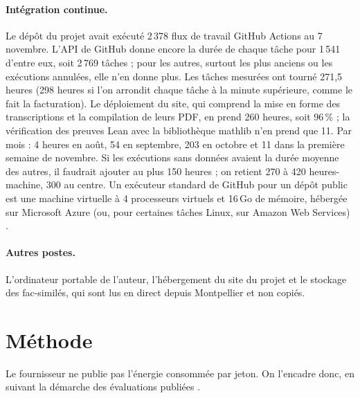 \documentclass[11pt,a4paper]{article}
\begin{document}
\paragraph{Intégration continue.} Le dépôt du projet avait exécuté 2\,378 flux de travail GitHub Actions au 7 novembre. L'API de GitHub donne encore la durée de chaque tâche pour 1\,541 d'entre eux, soit 2\,769 tâches ; pour les autres, surtout les plus anciens ou les exécutions annulées, elle n'en donne plus. Les tâches mesurées ont tourné 271,5 heures (298 heures si l'on arrondit chaque tâche à la minute supérieure, comme le fait la facturation). Le déploiement du site, qui comprend la mise en forme des transcriptions et la compilation de leurs PDF, en prend 260 heures, soit 96\,\% ; la vérification des preuves Lean avec la bibliothèque mathlib n'en prend que 11. Par mois : 4 heures en août, 54 en septembre, 203 en octobre et 11 dans la première semaine de novembre. Si les exécutions sans données avaient la durée moyenne des autres, il faudrait ajouter au plus 150 heures ; on retient 270 à 420 heures-machine, 300 au centre. Un exécuteur standard de GitHub pour un dépôt public est une machine virtuelle à 4 processeurs virtuels et 16\,Go de mémoire, hébergée sur Microsoft Azure (ou, pour certaines tâches Linux, sur Amazon Web Services) \citep{githubrunners}.

\paragraph{Autres postes.} L'ordinateur portable de l'auteur, l'hébergement du site du projet et le stockage des fac-similés, qui sont lus en direct depuis Montpellier et non copiés.

\section{Méthode}\label{sec:methode}

Le fournisseur ne publie pas l'énergie consommée par jeton. On l'encadre donc, en suivant la démarche des évaluations publiées \citep{luccioni2023,ligozat2022}.
\end{document}
